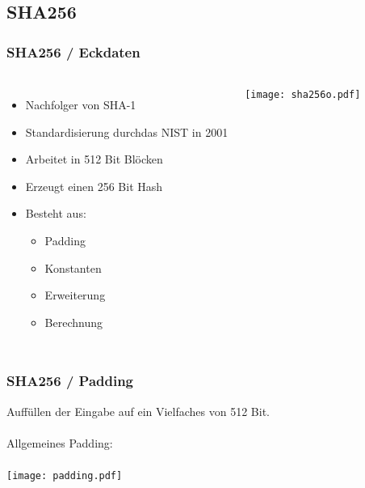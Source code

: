 \documentclass{beamer}
\begin{document}
\subsection{SHA256}
    \begin{frame}
      \frametitle{SHA256 / Eckdaten}
      \begin{columns}[T]
        \begin{itemize}
          \item Nachfolger von SHA-1\\
          \item Standardisierung durch\newline das NIST in 2001\\
          \item Arbeitet in 512 Bit Blöcken\\
          \item Erzeugt einen 256 Bit Hash\\
          \item Besteht aus:\\
          \begin{itemize}
            \item Padding\\
            \item Konstanten\\
            \item Erweiterung\\
            \item Berechnung
          \end{itemize}
        \end{itemize}
        \texttt{[image: sha256o.pdf]}
      \end{columns} 
    \end{frame}
    \begin{frame}
      \frametitle{SHA256 / Padding}
      Auffüllen der Eingabe auf ein Vielfaches von 512 Bit.\\
      ~\\
      Allgemeines Padding:\\
      ~\\
      \texttt{[image: padding.pdf]}\\
    \end{frame}
\end{document}
